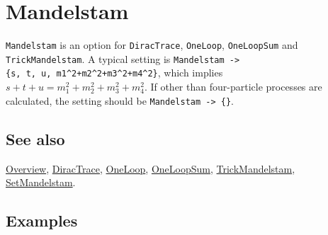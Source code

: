 \documentclass[../FeynCalcManual.tex]{subfiles}
\begin{document}
\hypertarget{mandelstam}{
\section{Mandelstam}\label{mandelstam}}

\texttt{Mandelstam} is an option for \texttt{DiracTrace},
\texttt{OneLoop}, \texttt{OneLoopSum} and \texttt{TrickMandelstam}. A
typical setting is
\texttt{Mandelstam -> \{\allowbreak{}s,\ \allowbreak{}t,\ \allowbreak{}u,\ \allowbreak{}m1^2+m2^2+m3^2+m4^2\}},
which implies \(s + t + u = m_1^2+m_2^2+m_3^2+m_4^2\). If other than
four-particle processes are calculated, the setting should be
\texttt{Mandelstam -> \{\allowbreak{}\}}.

\subsection{See also}

\hyperlink{toc}{Overview}, \hyperlink{diractrace}{DiracTrace},
\hyperlink{oneloop}{OneLoop}, \hyperlink{oneloopsum}{OneLoopSum},
\hyperlink{trickmandelstam}{TrickMandelstam},
\hyperlink{setmandelstam}{SetMandelstam}.

\subsection{Examples}
\end{document}
